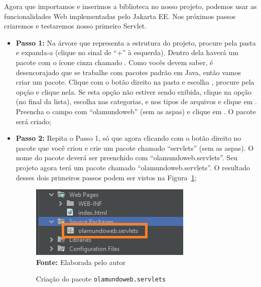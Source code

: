 Agora que importamos e inserimos a biblioteca  no nosso projeto, podemos usar as funcionalidades Web implementadas pelo Jakarta EE. Nos próximos passos criaremos e testaremos nosso primeiro Servlet.

\begin{itemize}
    
    \item \textbf{Passo 1:} Na árvore que representa a estrutura do projeto, procure pela pasta  e expanda-a (clique no sinal de ``+'' à esquerda). Dentro dela haverá um pacote com o ícone cinza chamado . Como vocês devem saber, é desencorajado que se trabalhe com pacotes padrão em Java, então vamos criar um pacote. Clique com o botão direito na pasta  e escolha , procure pela opção  e clique nela. Se esta opção não estiver sendo exibida, clique na opção  (no final da lista), escolha  nas categorias, e  nos tipos de arquivos e clique em . Preencha o campo  com ``olamundoweb'' (sem as aspas) e clique em . O pacote será criado;
        
    \item \textbf{Passo 2:} Repita o Passo 1, só que agora clicando com o botão direito no pacote que você criou e crie um pacote chamado ``servlets'' (sem as aspas). O nome do pacote deverá ser preenchido com ``olamundoweb.servlets''. Seu projeto agora terá um pacote chamado ``olamundoweb.servlets''. O resultado desses dois primeiros passos podem ser vistos na Figura~\ref{fig:cap01CriacaoPacote};
    
    \FloatBarrier
    \begin{figure}[!htbp]
        \centering
        \caption{Criação do pacote \texttt{olamundoweb.servlets}}
        \includegraphics[scale=0.9]{imagens/cap01CriacaoPacote}
        \\\textbf{Fonte:} Elaborada pelo autor
        \label{fig:cap01CriacaoPacote}
    \end{figure}
    \FloatBarrier
            

\end{itemize}
